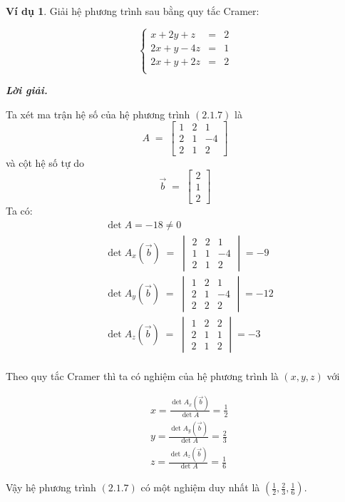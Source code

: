 \documentclass[12pt,a4paper,oneside]{book}
\theoremstyle{theorem}
\theoremstyle{definition}
\newtheorem{vd}[theorem2]{Ví dụ}
\begin{document}
\begin{vd}
    Giải hệ phương trình sau bằng quy tắc Cramer:
    
\begin{equation}
\left\{
\begin{array}{lcl}
x + 2y +z  &=& 2 \\
2x+y-4z &=& 1 \\
2x+y+2z &=& 2 \\
\end{array}
\right.
\end{equation}

\textbf{\textit{Lời giải.}}

Ta xét ma trận hệ số của hệ phương trình $(2.1.7)$ là 
\[A \;=\;
\begin{bmatrix}
1 &2 & 1  \\
2 & 1 & -4 \\
2 & 1& 2
\end{bmatrix}\]
và cột hệ số tự do \[\vec{b} \;=\;
\begin{bmatrix}
2\\1\\2
\end{bmatrix}\]
Ta có: \begin{align*}
    & \det A=-18\neq0\\
    & \det A_x(\vec{b}) \;=\;
\begin{vmatrix}
2 &2 & 1  \\
1 & 1 & -4 \\
2 & 1& 2
\end{vmatrix}=-9\\
    & \det A_y(\vec{b}) \;=\;
\begin{vmatrix}
1 &2 & 1  \\
2 & 1 & -4 \\
2 & 2& 2
\end{vmatrix}=-12\\
    &\det A_z(\vec{b}) \;=\;
\begin{vmatrix}
1 &2 & 2  \\
2 & 1 & 1 \\
2 & 1& 2
\end{vmatrix}=-3\\
\end{align*}


Theo quy tắc Cramer thì ta có nghiệm của hệ phương trình là $(x,y,z)$ với

\begin{align*}
    & \displaystyle x=\frac{\det A_x(\vec{b})}{\det A}=\frac{1}{2}\\
    & \displaystyle y=\frac{\det A_y(\vec{b})}{\det A}=\frac{2}{3}\\
    & \displaystyle z=\frac{\det A_z(\vec{b})}{\det A}=\frac{1}{6}
\end{align*}

Vậy hệ phương trình $(2.1.7)$ có một nghiệm duy nhất là $\left(\displaystyle \frac{1}2,\frac{2}3,\frac{1}6\right)$.
\end{vd}
    
\end{document}

